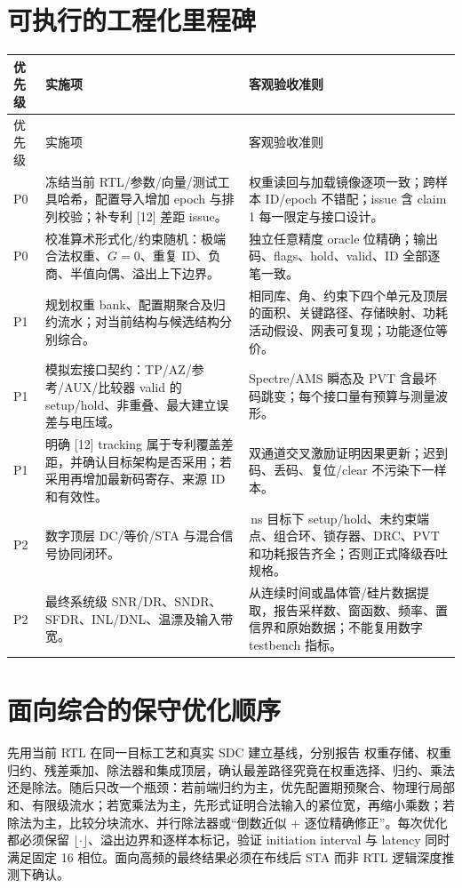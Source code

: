 \documentclass[UTF8,fontset=fandol,11pt,a4paper,openany]{ctexrep}
\begin{document}
\section{可执行的工程化里程碑}
\begin{longtable}{>{\raggedright\arraybackslash}p{12mm}>{\raggedright\arraybackslash}p{54mm}>{\raggedright\arraybackslash}p{86mm}}\toprule 优先级&实施项&客观验收准则\\\midrule\endfirsthead\toprule 优先级&实施项&客观验收准则\\\midrule\endhead
P0&冻结当前 RTL/参数/向量/测试工具哈希，配置导入增加 epoch 与排列校验；补专利 [12] 差距 issue。&权重读回与加载镜像逐项一致；跨样本 ID/epoch 不错配；issue 含 claim 1 每一限定与接口设计。\\
P0&校准算术形式化/约束随机：极端合法权重、\(G=0\)、重复 ID、负商、半值向偶、溢出上下边界。&独立任意精度 oracle 位精确；输出码、flags、hold、valid、ID 全部逐笔一致。\\
P1&规划权重 bank、配置期聚合及归约流水；对当前结构与候选结构分别综合。&相同库、角、约束下四个单元及顶层的面积、关键路径、存储映射、功耗活动假设、网表可复现；功能逐位等价。\\
P1&模拟宏接口契约：TP/AZ/参考/AUX/比较器 valid 的 setup/hold、非重叠、最大建立误差与电压域。&Spectre/AMS 瞬态及 PVT 含最坏码跳变；每个接口量有预算与测量波形。\\
P1&明确 [12] tracking 属于专利覆盖差距，并确认目标架构是否采用；若采用再增加最新码寄存、来源 ID 和有效性。&双通道交叉激励证明因果更新；迟到码、丢码、复位/clear 不污染下一样本。\\
P2&数字顶层 DC/等价/STA 与混合信号协同闭环。&1.5625\,ns 目标下 setup/hold、未约束端点、组合环、锁存器、DRC、PVT 和功耗报告齐全；否则正式降级吞吐规格。\\
P2&最终系统级 SNR/DR、SNDR、SFDR、INL/DNL、温漂及输入带宽。&从连续时间或晶体管/硅片数据提取，报告采样数、窗函数、频率、置信界和原始数据；不能复用数字 testbench 指标。\\
\bottomrule\end{longtable}

\section{面向综合的保守优化顺序}
先用当前 RTL 在同一目标工艺和真实 SDC 建立基线，分别报告 权重存储、权重归约、残差乘加、除法器和集成顶层，确认最差路径究竟在权重选择、归约、乘法还是除法。随后只改一个瓶颈：若前端归约为主，优先配置期预聚合、物理行局部和、有限级流水；若宽乘法为主，先形式证明合法输入的紧位宽，再缩小乘数；若除法为主，比较分块流水、并行除法器或“倒数近似 + 逐位精确修正”。每次优化都必须保留 \(\lfloor\cdot\rfloor\)、溢出边界和逐样本标记，验证 initiation interval 与 latency 同时满足固定 16 相位。面向高频的最终结果必须在布线后 STA 而非 RTL 逻辑深度推测下确认。
\end{document}
